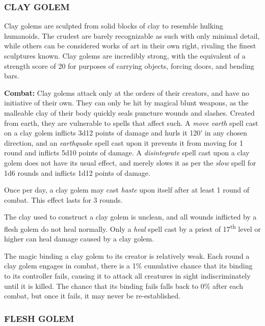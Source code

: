 \pagebreak

\begin{multicols}{2}

\subsubsection{CLAY GOLEM}

Clay golems are sculpted from solid blocks of clay to resemble hulking humanoids. The crudest are barely recognizable as such with only minimal detail, while others can be considered works of art in their own right, rivaling the finest sculptures known. Clay golems are incredibly strong, with the equivalent of a strength score of 20 for purposes of carrying objects, forcing doors, and bending bars. 

\textbf{Combat:} Clay golems attack only at the orders of their creators, and have no initiative of their own. They can only be hit by magical blunt weapons, as the malleable clay of their body quickly seals puncture wounds and slashes. Created from earth, they are vulnerable to spells that affect such. A \textit{move earth} spell cast on a clay golem inflicts 3d12 points of damage and hurls it 120' in any chosen direction, and an \textit{earthquake} spell cast upon it prevents it from moving for 1 round and inflicts 5d10 points of damage. A \textit{disintegrate} spell cast upon a clay golem does not have its usual effect, and merely slows it as per the \textit{slow} spell for 1d6 rounds and inflicts 1d12 points of damage.

Once per day, a clay golem may cast \textit{haste} upon itself after at least 1 round of combat. This effect lasts for 3 rounds.

The clay used to construct a clay golem is unclean, and all wounds inflicted by a flesh golem do not heal normally. Only a \textit{heal} spell cast by a priest of 17\textsuperscript{th} level or higher can heal damage caused by a clay golem.

The magic binding a clay golem to its creator is relatively weak. Each round a clay golem engages in combat, there is a 1\% cumulative chance that its binding to its controller fails, causing it to attack all creatures in sight indiscriminately until it is killed. The chance that its binding fails falls back to 0\% after each combat, but once it fails, it may never be re-established.

\subsubsection{FLESH GOLEM}


\end{multicols}
